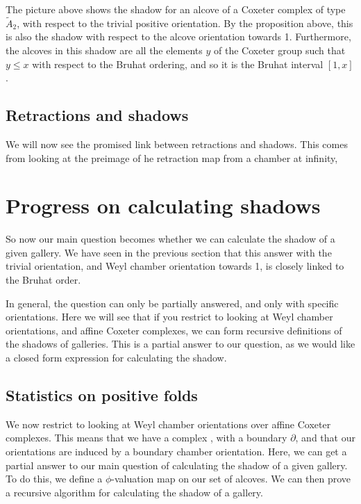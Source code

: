 \documentclass[11pt]{article}
\begin{document}
\begin{example}
    The picture above shows the shadow for an alcove of a Coxeter complex of type $\tilde{A}_2$, with respect to the trivial positive orientation. By the proposition above, this is also the shadow with respect to the alcove orientation towards 1. Furthermore, the alcoves in this shadow are all the elements $y$ of the Coxeter group such that $y\leq x$ with respect to the Bruhat ordering, and so it is the Bruhat interval $[1,x]$. 
\end{example}

\subsection{Retractions and shadows}\label{retract}
We will now see the promised link between retractions and shadows. This comes from looking at the preimage of he retraction map from a chamber at infinity, 

\section{Progress on calculating shadows}

So now our main question becomes whether we can calculate the shadow of a given gallery. We have seen in the previous section that this answer with the trivial orientation, and Weyl chamber orientation towards 1, is closely linked to the Bruhat order. 

In general, the question can only be partially answered, and only with specific orientations. Here we will see that if you restrict to looking at Weyl chamber orientations, and affine Coxeter complexes, we can form recursive definitions of the shadows of galleries. This is a partial answer to our question, as we would like a closed form expression for calculating the shadow. 

\subsection{Statistics on positive folds}

We now restrict to looking at Weyl chamber orientations over affine Coxeter complexes. This means that we have a complex \sg, with a boundary $\partial$\sg, and that our orientations are induced by a boundary chamber orientation. Here, we can get a partial answer to our main question of calculating the shadow of a given gallery. To do this, we define a $\phi$-valuation map on our set of alcoves. We can then prove a recursive algorithm for calculating the shadow of a gallery.
\end{document}
